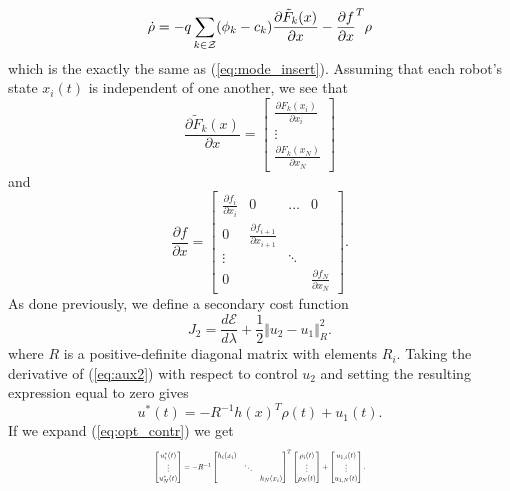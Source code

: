 \documentclass[letterpaper, 10 pt,  conference, twoside]{IEEEtran/IEEEtran}
\theoremstyle{definition}
\begin{document}
\begin{equation*}
\dot{\bold{\rho}} = - q\sum_{k \in \mathcal{Z}}(\phi_k - c_k) \frac{\partial \tilde{F}_k(x)}{\partial x} - \frac{\partial f}{\partial x }^T \rho
\end{equation*}
which is the exactly the same as (\ref{eq:mode_insert}).
Assuming that each robot's state $x_i(t)$ is independent of one another, we see that
\begin{equation*}
\frac{\partial \tilde{F}_k(x)}{\partial x} =
\begin{bmatrix}
\frac{\partial F_k(x_i)}{\partial x_i} \\
\vdots \\
\frac{\partial F_k(x_N)}{\partial x_N}
\end{bmatrix}
\end{equation*}
and
\begin{equation*}
\frac{\partial f}{\partial x} =
\begin{bmatrix}
\frac{\partial f_i}{\partial x_i} & 0 & \ldots & 0 \\
0 & \frac{\partial f_{i+1}}{\partial x_{i+1}} \\
\vdots & & \ddots  & \\
0 &  & & \frac{\partial f_N}{\partial x_N}
\end{bmatrix}.
\end{equation*}
As done previously, we define a secondary cost function
\begin{equation}  \label{eq:aux2}
J_2 = \frac{d \mathcal{E}}{d \lambda} + \frac{1}{2}\Vert u_2 - u_1 \Vert_R^2.
\end{equation}
where $R$ is a positive-definite diagonal matrix with elements $R_i$.
Taking the derivative of (\ref{eq:aux2}) with respect to control $u_2$ and setting the resulting expression equal to zero gives
\begin{equation} \label{eq:opt_contr}
u^* (t) = -R^{-1} h(x)^T \rho(t) + u_1(t).
\end{equation}
If we expand (\ref{eq:opt_contr}) we get
\begin{equation*}
\resizebox{0.45 \textwidth}{!}
{ $
\begin{bmatrix}
u^*_i (t) \\
\vdots \\
u^*_N(t) \\
\end{bmatrix}
=
-R^{-1}  \begin{bmatrix}
h_i(x_i) & \\
& \ddots & \\
& & h_N(x_i)
\end{bmatrix}^T
\begin{bmatrix}
\rho_i (t) \\
\vdots \\
\rho_N(t)
\end{bmatrix}
 +
 \begin{bmatrix}
 u_{1,i} (t) \\
 \vdots \\
 u_{1,N}(t)
 \end{bmatrix}
. $
}
\end{equation*}
\end{document}
